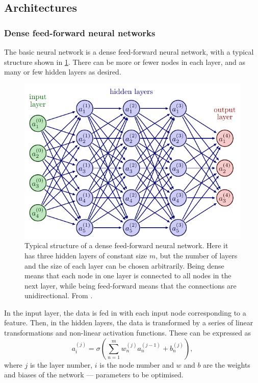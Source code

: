 \subsection{Architectures}
\subsubsection{Dense feed-forward neural networks}
The basic neural network is a dense feed-forward neural network, with a typical structure shown in \cref{fig:nn}.
There can be more or fewer nodes in each layer, and as many or few hidden layers as desired.

\begin{figure}
    \centering
    \includegraphics[width=0.7\linewidth, page=4]{neural_networks.pdf}
    \caption{
        Typical structure of a dense feed-forward neural network.
        Here it has three hidden layers of constant size $m$, but the number of layers and the size of each layer can be chosen arbitrarily.
        Being dense means that each node in one layer is connected to all nodes in the next layer, while being feed-forward means that the connections are unidirectional.
        From \cite{nn_figs}.
    }
    \label{fig:nn}
\end{figure}

In the input layer, the data is fed in with each input node corresponding to a feature.
Then, in the hidden layers, the data is transformed by a series of linear transformations and non-linear activation functions.
These can be expressed as
\begin{equation}
    \label{eq:nn}
    a_i^{(j)} = \sigma\left( \sum_{n=1}^m w^{(j)}_n a^{(j-1)}_n + b^{(j)}_n \right),
\end{equation}
where $j$ is the layer number, $i$ is the node number and $w$ and $b$ are the weights and biases of the network — parameters to be optimised.

